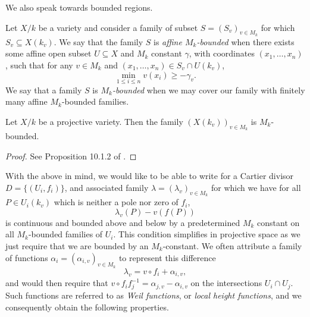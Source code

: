 We also speak towards bounded regions.

\begin{definition}
    Let $X/k$ be a variety and consider a family of subset $S = (S_v)_{v \in M_k}$ for which $S_v \subseteq X(k_v)$.
    We say that the family $S$ is \textit{affine $M_k$-bounded} when there exists some affine open subset $U \subseteq X$ and $M_k$ constant $\gamma$,
    with coordinates $(x_1, \ldots, x_n)$,
    such that for any $v \in M_k$ and $(x_1, \ldots, x_n) \in S_v \cap U(k_v)$,
    \[
        \min_{1 \leq i \leq n}  v(x_i) \geq -\gamma_v.
    \]
    We say that a family $S$ is \textit{$M_k$-bounded} when we may cover our family with finitely many affine $M_k$-bounded families.
\end{definition}

\begin{proposition}
    Let $X/k$ be a projective variety. 
    Then the family $(X(k_v))_{v \in M_k}$ is $M_k$-bounded.
\end{proposition}

\begin{proof}
    See Proposition 10.1.2 of \cite{Lang_2013}.
\end{proof}

With the above in mind,
we would like to be able to write for a Cartier divisor $D = \{(U_i, f_i)\}$,
and associated family $\lambda = (\lambda_v)_{v \in M_k}$ for which we have for all $P \in U_i(k_v)$ which is neither a pole nor zero of $f_i$,
\[
    \lambda_v(P) - v(f(P))
\]
is continuous and bounded above and below by a predetermined $M_k$ constant on all $M_k$-bounded families of $U_i$.
This condition simplifies in projective space as we just require that we are bounded by an $M_k$-constant.
We often attribute a family of functions $\alpha_i = (\alpha_{i, v})_{v \in M_k}$ to represent this difference
\[
    \lambda_v = v \circ f_i + \alpha_{i,v},
\]
and would then require that $v \circ f_i f_j^{-1} = \alpha_{j, v} - \alpha_{i, v}$ on the intersections $U_i \cap U_j$.
Such functions are referred to as \textit{Weil functions}, or \textit{local height functions},
and we consequently obtain the following properties.

